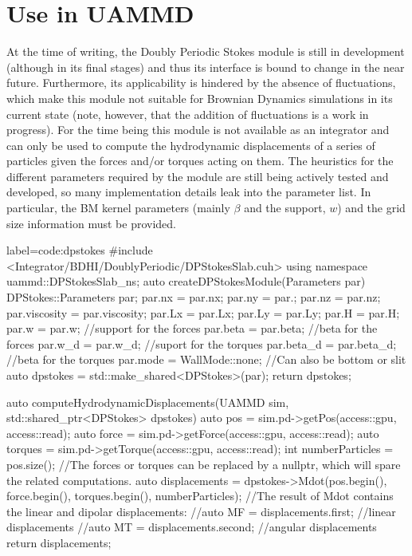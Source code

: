 \documentclass[ twoside,openright,titlepage,numbers=noenddot,%
headinclude,footinclude,cleardoublepage=empty,abstract=on,
BCOR=5mm,paper=b5,fontsize=11pt, dvipsnames
]{scrreprt}
\begin{document}
\section*{Use in UAMMD}
At the time of writing, the Doubly Periodic Stokes module is still in development (although in its final stages) and thus its interface is bound to change in the near future. Furthermore, its applicability is hindered by the absence of fluctuations, which make this module not suitable for Brownian Dynamics simulations in its current state (note, however, that the addition of fluctuations is a work in progress). For the time being this module is not available as an integrator and can only be used to compute the hydrodynamic displacements of a series of particles given the forces and/or torques acting on them. The heuristics for the different parameters required by the module are still being actively tested and developed, so many implementation details leak into the parameter list. In particular, the BM kernel parameters (mainly $\beta$ and the support, $w$) and the grid size information must be provided.

\begin{code2}{label=code:dpstokes}
#include <Integrator/BDHI/DoublyPeriodic/DPStokesSlab.cuh>
using namespace uammd::DPStokesSlab_ns;  
auto createDPStokesModule(Parameters par){
  DPStokes::Parameters par;
  par.nx         = par.nx;
  par.ny         = par.;
  par.nz	 = par.nz;
  par.viscosity	 = par.viscosity;
  par.Lx	 = par.Lx;
  par.Ly	 = par.Ly;
  par.H		 = par.H;
  par.w = par.w; //support for the forces
  par.beta = par.beta; //beta for the forces
  par.w_d = par.w_d; //suport for the torques
  par.beta_d = par.beta_d; //beta for the torques
  par.mode = WallMode::none; //Can also be bottom or slit
  auto dpstokes = std::make_shared<DPStokes>(par);
  return dpstokes;
}

auto computeHydrodynamicDisplacements(UAMMD sim, std::shared_ptr<DPStokes> dpstokes){
  auto pos = sim.pd->getPos(access::gpu, access::read);
  auto force = sim.pd->getForce(access::gpu, access::read);
  auto torques = sim.pd->getTorque(access::gpu, access::read);
  int numberParticles = pos.size();
  //The forces or torques can be replaced by a nullptr, which will spare the related computations.
  auto displacements = dpstokes->Mdot(pos.begin(), force.begin(), torques.begin(), numberParticles);
  //The result of Mdot contains the linear and dipolar displacements:
  //auto MF = displacements.first; //linear displacements
  //auto MT = displacements.second; //angular displacements
  return displacements;
}

\end{code2}
\end{document}
